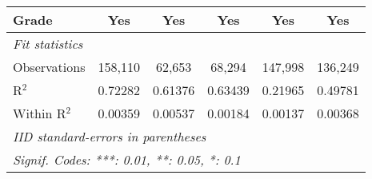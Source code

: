 \begin{table}[htbp]
\begin{tabular}{lccccc}
      Grade                & Yes             & Yes             & Yes            & Yes             & Yes\\
      \midrule \emph{Fit statistics} &   &   &   &   &  \\
      Observations         & 158,110         & 62,653          & 68,294         & 147,998         & 136,249\\
      R$^2$                & 0.72282         & 0.61376         & 0.63439        & 0.21965         & 0.49781\\
      Within R$^2$         & 0.00359         & 0.00537         & 0.00184        & 0.00137         & 0.00368\\
      \midrule\midrule\multicolumn{6}{l}{\emph{IID standard-errors in parentheses}}\\
      \multicolumn{6}{l}{\emph{Signif. Codes: ***: 0.01, **: 0.05, *: 0.1}}\\
   \end{tabular}
\end{table}


